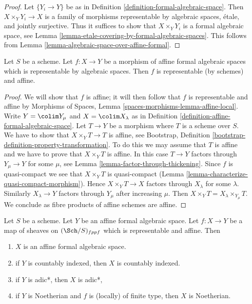 \begin{proof}
Let $\{Y_i \to Y\}$ be as in
Definition \ref{definition-formal-algebraic-space}.
Then $X \times_Y Y_i \to X$ is a family of morphisms
representable by algebraic spaces, \'etale, and jointly
surjective. Thus it suffices to show that
$X \times_Y Y_i$ is a formal algebraic space, see
Lemma \ref{lemma-etale-covering-by-formal-algebraic-spaces}.
This follows from Lemma \ref{lemma-algebraic-space-over-affine-formal}.
\end{proof}

\begin{lemma}
\label{lemma-affine-representable-by-algebraic-spaces}
Let $S$ be a scheme. Let $f : X \to Y$ be a morphism of
affine formal algebraic spaces which is representable by
algebraic spaces. Then $f$ is representable (by schemes) and affine.
\end{lemma}

\begin{proof}
We will show that $f$ is affine; it will then follow that
$f$ is representable and affine by
Morphisms of Spaces, Lemma \ref{spaces-morphisms-lemma-affine-local}.
Write $Y = \colim Y_\mu$ and $X = \colim X_\lambda$ as in
Definition \ref{definition-affine-formal-algebraic-space}.
Let $T \to Y$ be a morphism where $T$ is a scheme
over $S$. We have to show that $X \times_Y T \to T$ is affine, see
Bootstrap, Definition
\ref{bootstrap-definition-property-transformation}.
To do this we may assume that $T$ is affine and we have to prove
that $X \times_Y T$ is affine. In this case $T \to Y$ factors
through $Y_\mu \to Y$ for some $\mu$, see
Lemma \ref{lemma-factor-through-thickening}.
Since $f$ is quasi-compact we see that $X \times_Y T$ is
quasi-compact (Lemma \ref{lemma-characterize-quasi-compact-morphism}).
Hence $X \times_Y T \to X$ factors through $X_\lambda$ for some
$\lambda$. Similarly $X_\lambda \to Y$ factors through $Y_\mu$
after increasing $\mu$. Then
$X \times_Y T = X_\lambda \times_{Y_\mu} T$.
We conclude as fibre products of affine schemes are affine.
\end{proof}

\begin{lemma}
\label{lemma-property-goes-up-affine-morphism}
Let $S$ be a scheme. Let $Y$ be an affine formal algebraic space.
Let $f : X \to Y$ be a map of sheaves on $(\Sch/S)_{fppf}$ which
is representable and affine. Then
\begin{enumerate}
\item $X$ is an affine formal algebraic space.
\item if $Y$ is countably indexed, then $X$ is countably indexed.
\item if $Y$ is adic*, then $X$ is adic*,
\item if $Y$ is Noetherian and $f$ is (locally) of finite type, then
$X$ is Noetherian.
\end{enumerate}
\end{lemma}

